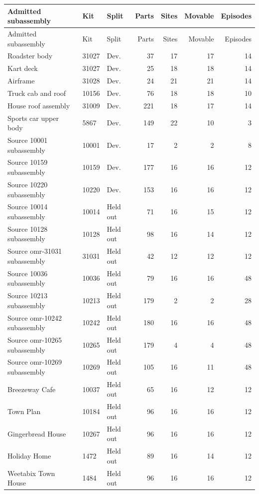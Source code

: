 \begin{longtable}{p{}llrrrr}\toprule
Admitted subassembly & Kit & Split & Parts & Sites & Movable & Episodes\\\midrule
\endfirsthead
\toprule
Admitted subassembly & Kit & Split & Parts & Sites & Movable & Episodes\\\midrule\endhead
\midrule\endfoot
\bottomrule\endlastfoot
Roadster body & 31027 & Dev. & 37 & 17 & 17 & 14\\
Kart deck & 31027 & Dev. & 25 & 18 & 18 & 14\\
Airframe & 31028 & Dev. & 24 & 21 & 21 & 14\\
Truck cab and roof & 10156 & Dev. & 76 & 18 & 18 & 10\\
House roof assembly & 31009 & Dev. & 221 & 18 & 17 & 14\\
Sports car upper body & 5867 & Dev. & 149 & 22 & 10 & 3\\
Source 10001 subassembly & 10001 & Dev. & 17 & 2 & 2 & 8\\
Source 10159 subassembly & 10159 & Dev. & 177 & 16 & 16 & 12\\
Source 10220 subassembly & 10220 & Dev. & 153 & 16 & 16 & 12\\
Source 10014 subassembly & 10014 & Held out & 71 & 16 & 15 & 12\\
Source 10128 subassembly & 10128 & Held out & 98 & 16 & 14 & 12\\
Source omr-31031 subassembly & 31031 & Held out & 42 & 12 & 12 & 12\\
Source 10036 subassembly & 10036 & Held out & 79 & 16 & 16 & 48\\
Source 10213 subassembly & 10213 & Held out & 179 & 2 & 2 & 28\\
Source omr-10242 subassembly & 10242 & Held out & 180 & 16 & 16 & 48\\
Source omr-10265 subassembly & 10265 & Held out & 179 & 4 & 4 & 48\\
Source omr-10269 subassembly & 10269 & Held out & 105 & 16 & 11 & 48\\
Breezeway Cafe & 10037 & Held out & 65 & 16 & 12 & 12\\
Town Plan & 10184 & Held out & 96 & 16 & 16 & 12\\
Gingerbread House & 10267 & Held out & 96 & 16 & 16 & 12\\
Holiday Home & 1472 & Held out & 89 & 16 & 14 & 12\\
Weetabix Town House & 1484 & Held out & 96 & 16 & 16 & 12\\

\end{longtable}
